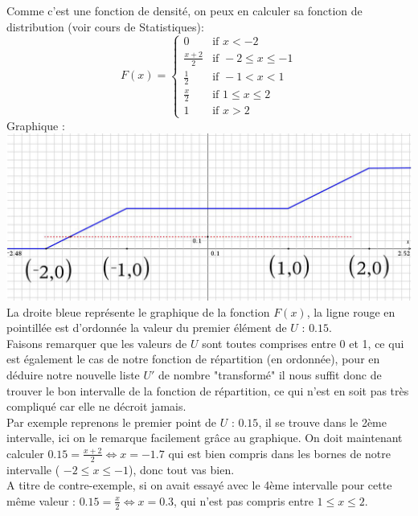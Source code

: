 \documentclass[11pt,a4paper]{report}
\begin{document}
			Comme c'est une fonction de densité, on peux en calculer sa fonction de distribution (voir cours de Statistiques):
			\[
				F(x) = 
				\begin{cases}
					0 &\text{if } x < -2\\
					\frac{x+2}{2} &\text{if } -2 \leq x \leq -1 \\
					\frac{1}{2} &\text{if } -1 < x < 1 \\
					\frac{x}{2} &\text{if } 1 \leq x \leq 2\\
					1 &\text{if } x > 2
				\end{cases}
			\]
			Graphique :\\
			\includegraphics[width=\textwidth]{monte-carlo-fonction-distribution}
			La droite bleue représente le graphique de la fonction $F(x)$, la ligne rouge en pointillée est d'ordonnée la valeur du premier élément de $U$ : $0.15$. \\
			
			Faisons remarquer que les valeurs de $U$ sont toutes comprises entre 0 et 1, ce qui est également le cas de notre fonction de répartition (en ordonnée), pour en déduire notre nouvelle liste $U'$ de nombre "transformé" il nous suffit donc de trouver le bon intervalle de la fonction de répartition, ce qui n'est en soit pas très compliqué car elle ne décroit jamais. \\
			
			Par exemple reprenons le premier point de $U$ : $0.15$, il se trouve dans le 2ème intervalle, ici on le remarque facilement grâce au graphique. On doit maintenant calculer $0.15 = \frac{x+2}{2} \Leftrightarrow x = -1.7 $ qui est bien compris dans les bornes de notre intervalle ( $-2 \leq x \leq -1$), donc tout vas bien.\\
			A titre de contre-exemple, si on avait essayé avec le 4ème intervalle pour cette même valeur : $0.15 = \frac{x}{2} \Leftrightarrow x = 0.3 $, qui n'est pas compris entre $1 \leq x \leq 2$.\\
			
\end{document}
